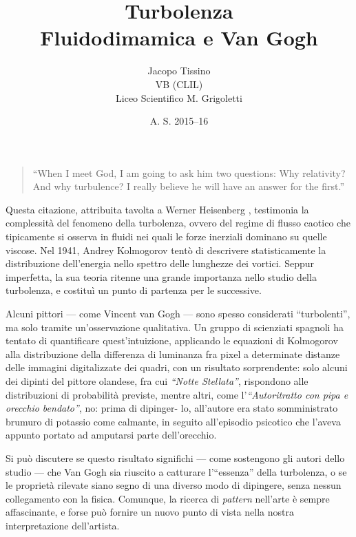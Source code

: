 \documentclass[12pt,a4paper]{article}
\author{Jacopo Tissino \\
VB
(CLIL)\\
Liceo Scientifico M. Grigoletti}
\date{A. S. 2015--16}
\title{\huge{\textbf{Turbolenza}}\\
\Large{Fluidodimamica e Van Gogh}}
\numberwithin{equation}{subsection}
\begin{document}
\maketitle

\begin{quote}
``When I meet God, I am going to ask him two questions: Why relativity? And why turbulence? I really believe he will have an answer for the first.''
\end{quote}

Questa citazione, attribuita tavolta a Werner Heisenberg \cite{heisenberg}, testimonia la complessità del fenomeno della turbolenza, ovvero del regime di flusso caotico che tipicamente si osserva in fluidi nei quali le forze inerziali dominano su quelle viscose. 
Nel 1941, Andrey Kolmogorov tentò di descrivere statisticamente la distribuzione dell'energia nello spettro delle lunghezze dei vortici. Seppur imperfetta, la sua teoria ritenne una grande importanza nello studio della turbolenza, e costituì un punto di partenza per le successive.

Alcuni pittori --- come Vincent van Gogh --- sono spesso considerati ``turbolenti'', ma solo tramite un'osservazione qualitativa. Un gruppo di scienziati spagnoli \cite{study2006} ha tentato di quantificare quest'intuizione, applicando le equazioni di Kolmogorov alla distribuzione della differenza di luminanza fra pixel a determinate distanze delle immagini digitalizzate dei quadri, con un risultato sorprendente: solo alcuni dei dipinti del pittore olandese, fra cui \emph{``Notte Stellata''}, rispondono alle distribuzioni di probabilità previste, mentre altri, come l'\emph{``Autoritratto con pipa e orecchio bendato''}, no: prima di dipinger-  lo, all'autore era stato somministrato brumuro di potassio come calmante, in seguito all'episodio psicotico che l'aveva appunto portato ad amputarsi parte dell'orecchio.

Si può discutere se questo risultato significhi --- come sostengono gli autori dello studio --- che Van Gogh sia riuscito a catturare l'``essenza'' della turbolenza, o se le proprietà rilevate siano segno di una diverso modo di dipingere, senza nessun collegamento con la fisica.
Comunque, la ricerca di \emph{pattern} nell'arte è sempre affascinante, e forse può fornire un nuovo punto di vista nella nostra interpretazione dell'artista.

\vspace{7mm}

\end{document}
